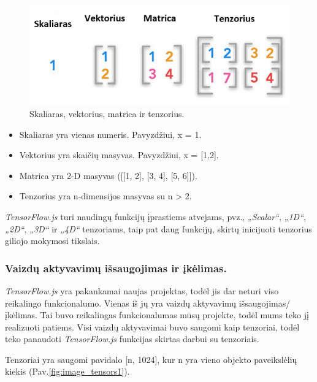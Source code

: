 \documentclass{VUMIFInfKursinis}
\begin{document}
\begin{figure}[h!]
\centering
  \includegraphics[scale=0.7]{img/Tensor.PNG}
  \caption{Skaliaras, vektorius, matrica ir tenzorius.}
  \label{fig:tensor}
\end{figure}

\begin{itemize}
  \item Skaliaras yra vienas numeris. Pavyzdžiui, x = 1.
  \item Vektorius yra skaičių masyvas. Pavyzdžiui, x = [1,2].
  \item Matrica yra 2-D masyvas
([[1, 2],
  [3, 4],
  [5, 6]]).
  \item Tenzorius yra n-dimensijos masyvas su n > 2.
\end{itemize} 

\textit{TensorFlow.js} turi naudingų funkcijų įprastiems atvejams, pvz., \textit{„Scalar“}, \textit{„1D“}, \textit{„2D“}, \textit{„3D“} ir \textit{„4D“} tenzoriams, taip pat daug funkcijų, skirtų inicijuoti tenzorius giliojo mokymosi tikslais.

\subsubsection{Vaizdų aktyvavimų išsaugojimas ir įkėlimas.}

\textit{TensorFlow.js} yra pakankamai naujas projektas, todėl jis dar neturi viso reikalingo funkcionalumo. Vienas iš jų yra vaizdų aktyvavimų išsaugojimas/įkėlimas. Tai buvo reikalingas funkcionalumas mūsų projekte, todėl mums teko jį realizuoti patiems. Visi vaizdų aktyvavimai buvo saugomi kaip tenzoriai, todėl teko panaudoti \textit{TensorFlow.js} funkcijas skirtas darbui su tenzoriais.

Tenzoriai yra saugomi pavidalo [n, 1024], kur n yra vieno objekto paveikslėlių kiekis (Pav.\ref{fig:image_tensors1}).
\end{document}
